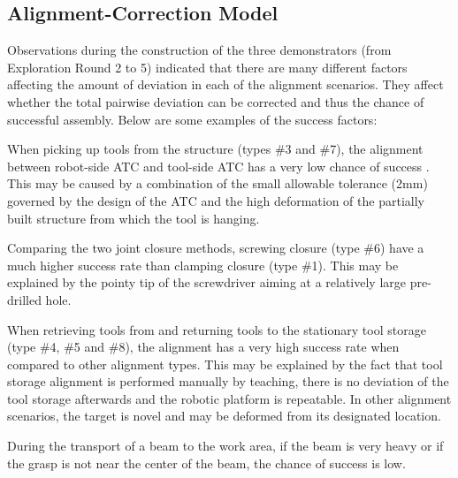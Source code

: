 \subsection{Alignment-Correction Model}
\label{subsection:new-hypo-alignment-correction-model}

Observations during the construction of the three demonstrators (from Exploration Round 2 to 5) indicated that there are many different factors affecting the amount of deviation in each of the alignment scenarios. They affect whether the total pairwise deviation can be corrected and thus the chance of successful assembly. Below are some examples of the success factors:

\begin{description}[] %
	\item [Tight tolerance, deviation of partially assembled structure] When picking up tools from the structure (types \#3 and \#7), the alignment between robot-side ATC and tool-side ATC has a very low chance of success . This may be caused by a combination of the small allowable tolerance (2mm) governed by the design of the ATC and the high deformation of the partially built structure from which the tool is hanging.

	\item [Correction range] Comparing the two joint closure methods, screwing closure (type \#6) have a much higher success rate than clamping closure (type \#1). This may be explained by the pointy tip of the screwdriver aiming at a relatively large pre-drilled hole.

	\item [Deviation] When retrieving tools from and returning tools to the stationary tool storage (type \#4, \#5 and \#8), the alignment has a very high success rate when compared to other alignment types. This may be explained by the fact that tool storage alignment is performed manually by teaching, there is no deviation of the tool storage afterwards and the robotic platform is repeatable. In other alignment scenarios, the target is novel and may be deformed from its designated location.

	\item [Payload] During the transport of a beam to the work area, if the beam is very heavy  or if the grasp is not near the center of the beam, the chance of success is low.

\end{description}

